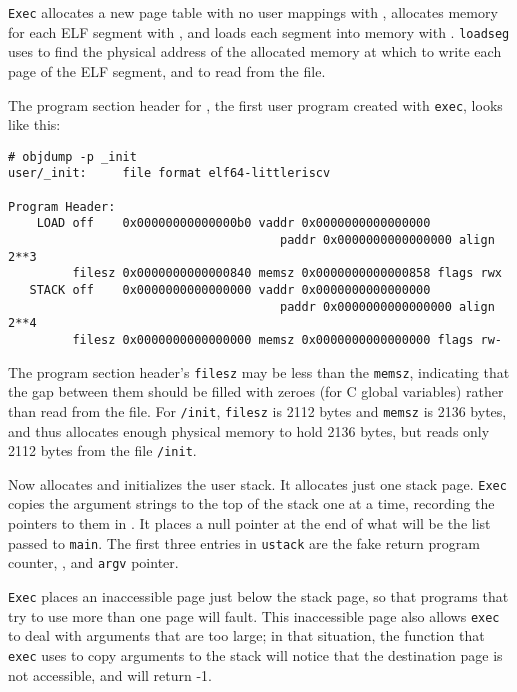 \lstinline{Exec}
allocates a new page table with no user mappings with
,
allocates memory for each ELF segment with
,
and loads each segment into memory with
.
\lstinline{loadseg}
uses
to find the physical address of the allocated memory at which to write
each page of the ELF segment, and
to read from the file.

The program section header for
,
the first user program created with
\lstinline{exec},
looks like this:
\begin{footnotesize}
\begin{verbatim}
# objdump -p _init
user/_init:     file format elf64-littleriscv

Program Header:
    LOAD off    0x00000000000000b0 vaddr 0x0000000000000000 
                                      paddr 0x0000000000000000 align 2**3
         filesz 0x0000000000000840 memsz 0x0000000000000858 flags rwx
   STACK off    0x0000000000000000 vaddr 0x0000000000000000 
                                      paddr 0x0000000000000000 align 2**4
         filesz 0x0000000000000000 memsz 0x0000000000000000 flags rw-
\end{verbatim}
\end{footnotesize}

The program section header's
\lstinline{filesz}
may be less than the
\lstinline{memsz},
indicating that the gap between them should be filled
with zeroes (for C global variables) rather than read from the file.
For
\lstinline{/init},
\lstinline{filesz}
is 2112 bytes and
\lstinline{memsz}
is 2136 bytes,
and thus
allocates enough physical memory to hold 2136 bytes, but reads only 2112 bytes
from the file
\lstinline{/init}.

Now
allocates and initializes the user stack.
It allocates just one stack page.
\lstinline{Exec}
copies the argument strings to the top of the stack
one at a time, recording the pointers to them in
.
It places a null pointer at the end of what will be the
list passed to
\lstinline{main}.
The first three entries in
\lstinline{ustack}
are the fake return program counter,
,
and
\lstinline{argv}
pointer.

\lstinline{Exec}
places an inaccessible page just below the stack page,
so that programs that try to use more than one page will fault.
This inaccessible page also allows
\lstinline{exec}
to deal with arguments that are too large;
in that situation,
the
function that
\lstinline{exec}
uses to copy arguments to the stack will notice that
the destination page is not accessible, and will
return -1.

